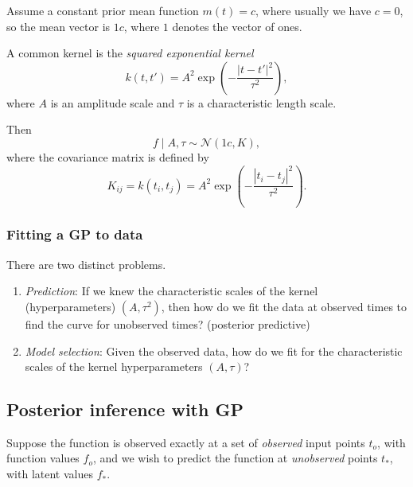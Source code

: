 \documentclass[11pt, titlepage]{article} %
\numberwithin{equation}{section}
\theoremstyle{definition}
\numberwithin{assumption}{section}
\begin{document}
Assume a constant prior mean function $m(t)=c$, where usually we have $c=0$,
so the mean vector is ${1}c$, where $1$ denotes the vector of ones.

A common kernel is the \textit{squared exponential kernel}
\begin{equation*}
    k(t,t')
    =
    A^2\exp\!\left(-\frac{|t-t'|^2}{\tau^2}\right),
\end{equation*}
where $A$ is an amplitude scale and $\tau$ is a characteristic length scale.

Then
\begin{equation*}
    f\mid A,\tau \sim \mathcal{N}(1c,K),
\end{equation*}
where the covariance matrix is defined by
\begin{equation*}
    K_{ij}=k(t_i,t_j)=A^2\exp\!\left(-\frac{|t_i-t_j|^2}{\tau^2}\right).
\end{equation*}


\subsubsection*{Fitting a GP to data}

There are two distinct problems.

\begin{enumerate}
    \item \textit{Prediction}: If we knew the characteristic scales of
    the kernel (hyperparameters) $(A,\tau^2)$, then how do we  fit the data at observed times to find the curve for unobserved times? (posterior predictive)
    \item \textit{Model selection}: Given the observed data, how do we fit for the characteristic scales of the kernel hyperparameters $(A,\tau)$?
\end{enumerate}


\subsection{Posterior inference with GP}

Suppose the function is observed exactly at a set of \textit{observed} input points $t_o$, with function values $f_o$, and we wish to predict the function at \textit{unobserved} points $t_*$, with latent values $f_*$.
\end{document}
